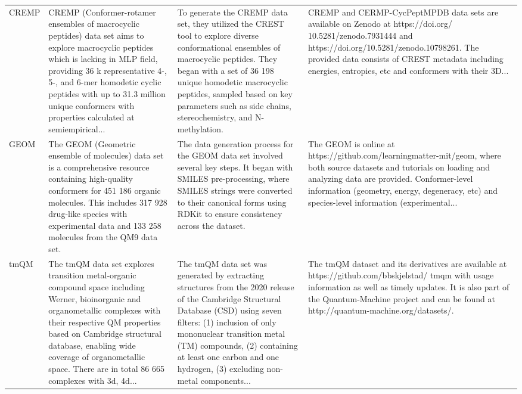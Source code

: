 \documentclass[12pt]{article}
\begin{document}
\begin{longtable}{p{}p{}p{}p{}}
CREMP \cite{ds33-15} & CREMP (Conformer-rotamer ensembles of macrocyclic peptides) data set aims to explore macrocyclic peptides which is lacking in MLP field, providing 36 k representative 4-, 5-, and 6-mer homodetic cyclic peptides with up to 31.3 million unique conformers with properties calculated at semiempirical... & To generate the CREMP data set, they utilized the CREST tool to explore diverse conformational ensembles of macrocyclic peptides. They began with a set of 36 198 unique homodetic macrocyclic peptides, sampled based on key parameters such as side chains, stereochemistry, and N-methylation. & CREMP and CERMP-CycPeptMPDB data sets are available on Zenodo at https://doi.org/ 10.5281/zenodo.7931444 and https://doi.org/10.5281/zenodo.10798261. The provided data consists of CREST metadata including energies, entropies, etc and conformers with their 3D... \cite{ds33-97,ds33-165} \\
GEOM \cite{ds34-1} & The GEOM (Geometric ensemble of molecules) data set is a comprehensive resource containing high-quality conformers for 451 186 organic molecules. This includes 317 928 drug-like species with experimental data and 133 258 molecules from the QM9 data set. & The data generation process for the GEOM data set involved several key steps. It began with SMILES pre-processing, where SMILES strings were converted to their canonical forms using RDKit to ensure consistency across the dataset. & The GEOM is online at https://github.com/learningmatter-mit/geom, where both source datasets and tutorials on loading and analyzing data are provided. Conformer-level information (geometry, energy, degeneracy, etc) and species-level information (experimental... \cite{ds34-1,ds34-168} \\
tmQM \cite{ds35-46} & The tmQM data set explores transition metal-organic compound space including Werner, bioinorganic and organometallic complexes with their respective QM properties based on Cambridge structural database, enabling wide coverage of organometallic space. There are in total 86 665 complexes with 3d, 4d... & The tmQM data set was generated by extracting structures from the 2020 release of the Cambridge Structural Database (CSD) using seven filters: (1) inclusion of only mononuclear transition metal (TM) compounds, (2) containing at least one carbon and one hydrogen, (3) excluding non-metal components... & The tmQM dataset and its derivatives are available at https://github.com/bbskjelstad/ tmqm with usage information as well as timely updates. It is also part of the Quantum-Machine project and can be found at http://quantum-machine.org/datasets/. \cite{ds35-46} \\

\end{longtable}
\end{document}

